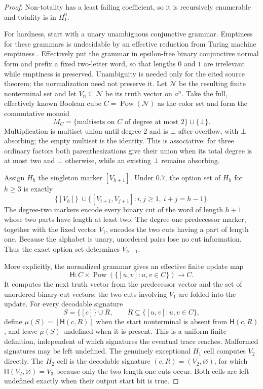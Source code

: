 \documentclass[11pt]{article}
\theoremstyle{definition}
\theoremstyle{remark}
\newcommand{\Pow}{\operatorname{Pow}}
\begin{document}
\begin{proof}
Non-totality has a least failing coefficient, so it is recursively
enumerable and totality is in $\Pi^0_1$.

For hardness, start with a unary unambiguous conjunctive grammar.  Emptiness
for these grammars is undecidable by an effective reduction from Turing
machine emptiness \cite[Lemma~12]{jezokhotin2017}.  Effectively put the
grammar in epsilon-free binary conjunctive normal form and prefix a fixed
two-letter word, so that lengths $0$ and $1$ are irrelevant while emptiness
is preserved.  Unambiguity is needed only for the cited source theorem; the
normalization need not preserve it.  Let $\mathcal N$ be the resulting finite
nonterminal set and let $V_n\subseteq\mathcal N$ be its truth vector on
$a^n$.  Take the full, effectively known Boolean cube
$C=\Pow(\mathcal N)$ as the color set and form the commutative monoid
\[
 M_C=\{\text{multisets on $C$ of degree at most $2$}\}\sqcup\{\bot\}.
\]
Multiplication is multiset union until degree $2$ and is $\bot$ after
overflow, with $\bot$ absorbing; the empty multiset is the identity.  This is
associative: for three ordinary factors both parenthesizations give their
union when its total degree is at most two and $\bot$ otherwise, while an
existing $\bot$ remains absorbing.

Assign $H_h$ the singleton marker $[V_{h+1}]$.  Under $0.7$, the option set
of $H_h$ for $h\ge3$ is exactly
\begin{equation}
 \{[V_h]\}\ \cup
 \{[V_{i+1},V_{j+1}]:i,j\ge1,\ i+j=h-1\}.
\end{equation}
The degree-two markers encode every binary cut of the word of length $h+1$
whose two parts have length at least two.  The degree-one predecessor marker,
together with the fixed vector $V_1$, encodes the two cuts having a part of
length one.  Because the alphabet is unary, unordered pairs lose no cut
information.  Thus the exact option set determines $V_{h+1}$.

More explicitly, the normalized grammar gives an effective finite update
map
\[
 \mathsf H:C\times\Pow(\{[u,v]:u,v\in C\})\longrightarrow C.
\]
It computes the next truth vector from the predecessor vector and the set of
unordered binary-cut vectors; the two cuts involving $V_1$ are folded into
the update.  For every decodable signature
\[
 S=\{[c]\}\cup R,
 \qquad R\subseteq\{[u,v]:u,v\in C\},
\]
define $\mu(S)=[\mathsf H(c,R)]$ when the start nonterminal is absent from
$\mathsf H(c,R)$, and leave $\mu(S)$ undefined when it is present.  This is a
uniform finite definition, independent of which signatures the eventual
trace reaches.  Malformed signatures may be left undefined.  The genuinely
exceptional $H_1$ cell computes $V_2$ directly.  The $H_2$ cell is the
decodable signature $(c,R)=(V_2,\varnothing)$, for which
$\mathsf H(V_2,\varnothing)=V_3$ because only the two length-one cuts occur.
Both cells are left undefined exactly when their output start bit is true.


\end{proof}
\end{document}
